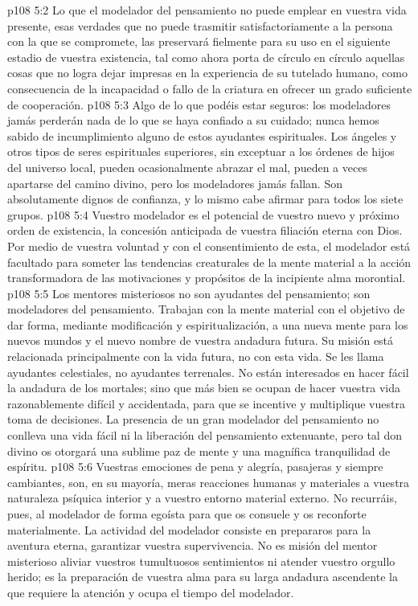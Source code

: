\vs p108 5:2 Lo que el modelador del pensamiento no puede emplear en vuestra vida presente, esas verdades que no puede trasmitir satisfactoriamente a la persona con la que se compromete, las preservará fielmente para su uso en el siguiente estadio de vuestra existencia, tal como ahora porta de círculo en círculo aquellas cosas que no logra dejar impresas en la experiencia de su tutelado humano, como consecuencia de la incapacidad o fallo de la criatura en ofrecer un grado suficiente de cooperación.
\vs p108 5:3 Algo de lo que podéis estar seguros: los modeladores jamás perderán nada de lo que se haya confiado a su cuidado; nunca hemos sabido de incumplimiento alguno de estos ayudantes espirituales. Los ángeles y otros tipos de seres espirituales superiores, sin exceptuar a los órdenes de hijos del universo local, pueden ocasionalmente abrazar el mal, pueden a veces apartarse del camino divino, pero los modeladores jamás fallan. Son absolutamente dignos de confianza, y lo mismo cabe afirmar para todos los siete grupos.
\vs p108 5:4 \pc Vuestro modelador es el potencial de vuestro nuevo y próximo orden de existencia, la concesión anticipada de vuestra filiación eterna con Dios. Por medio de vuestra voluntad y con el consentimiento de esta, el modelador está facultado para someter las tendencias creaturales de la mente material a la acción transformadora de las motivaciones y propósitos de la incipiente alma morontial.
\vs p108 5:5 Los mentores misteriosos no son ayudantes del pensamiento; son modeladores del pensamiento. Trabajan con la mente material con el objetivo de dar forma, mediante modificación y espiritualización, a una nueva mente para los nuevos mundos y el nuevo nombre de vuestra andadura futura. Su misión está relacionada principalmente con la vida futura, no con esta vida. Se les llama ayudantes celestiales, no ayudantes terrenales. No están interesados en hacer fácil la andadura de los mortales; sino que más bien se ocupan de hacer vuestra vida razonablemente difícil y accidentada, para que se incentive y multiplique vuestra toma de decisiones. La presencia de un gran modelador del pensamiento no conlleva una vida fácil ni la liberación del pensamiento extenuante, pero tal don divino os otorgará una sublime paz de mente y una magnífica tranquilidad de espíritu.
\vs p108 5:6 Vuestras emociones de pena y alegría, pasajeras y siempre cambiantes, son, en su mayoría, meras reacciones humanas y materiales a vuestra naturaleza psíquica interior y a vuestro entorno material externo. No recurráis, pues, al modelador de forma egoísta para que os consuele y os reconforte materialmente. La actividad del modelador consiste en prepararos para la aventura eterna, garantizar vuestra supervivencia. No es misión del mentor misterioso aliviar vuestros tumultuosos sentimientos ni atender vuestro orgullo herido; es la preparación de vuestra alma para su larga andadura ascendente la que requiere la atención y ocupa el tiempo del modelador.
